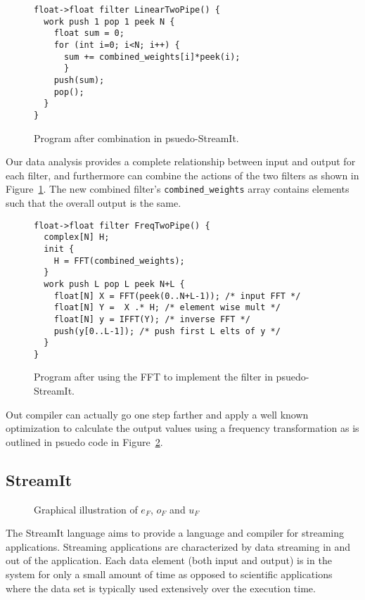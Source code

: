 \begin{figure}
\scriptsize
\begin{verbatim}
float->float filter LinearTwoPipe() {
  work push 1 pop 1 peek N {
    float sum = 0;
    for (int i=0; i<N; i++) {
      sum += combined_weights[i]*peek(i);
      }
    push(sum);
    pop();
  }
}
\end{verbatim}
\caption{Program after combination in psuedo-StreamIt.}
\label{fig:example-combine}
\end{figure}

Our data analysis provides a complete relationship between input and output for
each filter, and furthermore can combine the actions of the two filters as shown
in Figure~\ref{fig:example-combine}. The new combined filter's {\tt combined\_weights}
array contains elements such that the overall output is the same.

\begin{figure}
\scriptsize
\begin{verbatim}
float->float filter FreqTwoPipe() {
  complex[N] H;
  init {
    H = FFT(combined_weights);
  }
  work push L pop L peek N+L {
    float[N] X = FFT(peek(0..N+L-1)); /* input FFT */
    float[N] Y =  X .* H; /* element wise mult */
    float[N] y = IFFT(Y); /* inverse FFT */
    push(y[0..L-1]); /* push first L elts of y */
  }
}
\end{verbatim}
\caption{Program after using the FFT to implement the filter in psuedo-StreamIt.}
\label{fig:example-frequency}
\end{figure}

Out compiler can actually go one step farther and apply a well known 
optimization to calculate the output values using a frequency transformation
as is outlined in psuedo code in Figure~\ref{fig:example-frequency}.




\subsection{StreamIt}

\begin{figure}
\center
\epsfxsize=3.0in
\caption{Graphical illustration of $e_{F}$, $o_{F}$ and $u_{F}$}
\label{fig:overview-filter}
\end{figure}


The StreamIt\cite{streamitcc, streamit-asplos, gordon-thesis} language
aims to provide a language and compiler for streaming applications. Streaming applications 
are characterized by data streaming in and out of the application. Each data element (both
input and output) is in the system for only a small amount of time as opposed to scientific
applications where the data set is typically used extensively over the execution time.

